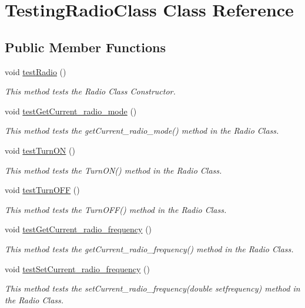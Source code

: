 \hypertarget{class_testing_radio_class}{}\section{Testing\+Radio\+Class Class Reference}
\label{class_testing_radio_class}
\subsection*{Public Member Functions}
\begin{DoxyCompactItemize}
\item 
void \hyperlink{class_testing_radio_class_a525adf8d7f1503304449d03b5f9182e2}{test\+Radio} ()
\begin{DoxyCompactList}\small\item\em This method tests the Radio Class Constructor. \end{DoxyCompactList}\item 
void \hyperlink{class_testing_radio_class_a3ece62000595048788afa3504dce9b31}{test\+Get\+Current\+\_\+radio\+\_\+mode} ()
\begin{DoxyCompactList}\small\item\em This method tests the get\+Current\+\_\+radio\+\_\+mode() method in the Radio Class. \end{DoxyCompactList}\item 
void \hyperlink{class_testing_radio_class_a538fb50b011e98d694fa3cb25387c20d}{test\+Turn\+O\+N} ()
\begin{DoxyCompactList}\small\item\em This method tests the Turn\+O\+N() method in the Radio Class. \end{DoxyCompactList}\item 
void \hyperlink{class_testing_radio_class_a83bd5915df9689d138ac29bf46fe11fb}{test\+Turn\+O\+F\+F} ()
\begin{DoxyCompactList}\small\item\em This method tests the Turn\+O\+F\+F() method in the Radio Class. \end{DoxyCompactList}\item 
void \hyperlink{class_testing_radio_class_a7692104daa964fd22d00ae2b5ada2fcb}{test\+Get\+Current\+\_\+radio\+\_\+frequency} ()
\begin{DoxyCompactList}\small\item\em This method tests the get\+Current\+\_\+radio\+\_\+frequency() method in the Radio Class. \end{DoxyCompactList}\item 
void \hyperlink{class_testing_radio_class_a6a683c13c5bf796adf275da920d40556}{test\+Set\+Current\+\_\+radio\+\_\+frequency} ()
\begin{DoxyCompactList}\small\item\em This method tests the set\+Current\+\_\+radio\+\_\+frequency(double setfrequency) method in the Radio Class. \end{DoxyCompactList}\end{DoxyCompactItemize}


